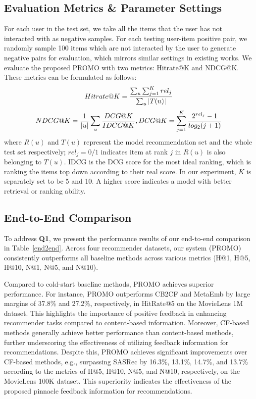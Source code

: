 \documentclass[sigconf]{acmart}
\newcommand{\sys}{\textsc{PROMO}\xspace}
\begin{document}
\subsection{Evaluation Metrics \& Parameter Settings}




For each user in the test set, we take all the items that the user has not interacted with as negative samples. 
For each testing user-item positive pair, we randomly sample 100 items which are not interacted by the user to generate negative pairs for evaluation, which mirrors similar settings in existing works.
We evaluate the proposed \sys with two metrics: Hitrate@K and NDCG@K. 
These metrics can be formulated as follows:
\begin{equation} \small
\label{equ:hr}
Hitrate@K = \frac{ \sum_{u} \sum_{j=1}^{K}rel_j }{\sum_{u}|T(u)|}
\end{equation}
\begin{equation} \small
NDCG@K = \frac{1}{|u|} \sum_{u} \frac{DCG@K}{IDCG@K}, DCG@K=\sum_{j=1}^{K}\frac{2^{rel_j}-1}{log_2(j+1)}
\end{equation}
where $R(u)$ and $T(u)$ represent the model recommendation set and the whole test set respectively; $rel_j=0/1$ indicates item at rank $j$ in $R(u)$ is also belonging to $T(u)$. IDCG is the DCG score for the most ideal ranking, which is ranking the items top down according to their real score. 
In our experiment, $K$ is separately set to be 5 and 10. A higher score indicates a model with better retrieval or ranking ability.

\subsection{End-to-End Comparison} 
To address \textbf{Q1}, we present the performance results of our end-to-end comparison in Table~\ref{end2end}. 
Across four recommender datasets, our system (\sys) consistently outperforms all baseline methods across various metrics (H@1, H@5, H@10, N@1, N@5, and N@10). 

Compared to cold-start baseline methods, \sys achieves superior performance. 
For instance, \sys outperforms CB2CF and MetaEmb by large margins of 37.8\% and 27.2\%, respectively, in HitRate@5 on the MovieLens 1M dataset. 
This highlights the importance of positive feedback in enhancing recommender tasks compared to content-based information. 
Moreover, CF-based methods generally achieve better performance than content-based methods, further underscoring the effectiveness of utilizing feedback information for recommendations. 
Despite this, \sys achieves significant improvements over CF-based methods, e.g., surpassing SASRec by 16.3\%, 13.1\%, 14.7\%, and 13.7\% according to the metrics of H@5, H@10, N@5, and N@10, respectively, on the MovieLens 100K dataset. 
This superiority indicates the effectiveness of the proposed pinnacle feedback information for recommendations.
\end{document}
